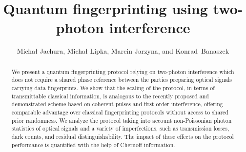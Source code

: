 \documentclass[10pt]{article}
\begin{document}
\title{Quantum fingerprinting using two-photon interference}

\author{Micha\l{} Jachura, Micha\l{} Lipka, Marcin Jarzyna, and Konrad~Banaszek}

\address{Faculty of Physics, University of Warsaw, Pasteura 5, 02-093 Warszawa, Poland\\
Centre of New Technologies, University of Warsaw, Banacha 2, 02-097, Warszawa, Poland\\
}




\begin{abstract}
We present a quantum fingerprinting protocol relying on two-photon interference which does not require a shared phase reference between the parties preparing optical signals carrying data fingerprints. We show that the scaling of the protocol, in terms of transmittable classical information, is analogous to the recently proposed and demonstrated scheme based on coherent pulses and first-order interference, offering comparable advantage over classical fingerprinting protocols without access to shared prior randomness. We analyze the protocol taking into account non-Poissonian photon statistics of optical signals and a variety of imperfections, such as transmission losses, dark counts, and residual distinguishability. The impact of these effects on the protocol performance is quantified with the help of Chernoff information.
\end{abstract}
\end{document}
